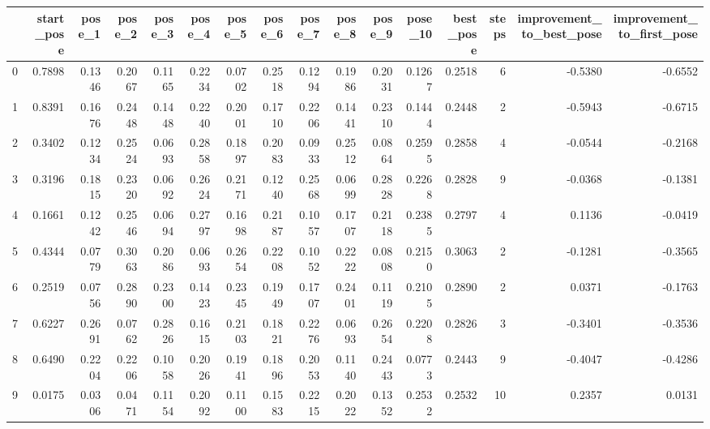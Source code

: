 \begin{tabular}{lrrrrrrrrrrrrrrr}
\toprule
{} &  start\_pose &  pose\_1 &  pose\_2 &  pose\_3 &  pose\_4 &  pose\_5 &  pose\_6 &  pose\_7 &  pose\_8 &  pose\_9 &  pose\_10 &  best\_pose &  steps &  improvement\_to\_best\_pose &  improvement\_to\_first\_pose \\
\midrule
0   &      0.7898 &  0.1346 &  0.2067 &  0.1165 &  0.2234 &  0.0702 &  0.2518 &  0.1294 &  0.1986 &  0.2031 &   0.1267 &     0.2518 &      6 &                   -0.5380 &                    -0.6552 \\
1   &      0.8391 &  0.1676 &  0.2448 &  0.1448 &  0.2240 &  0.2001 &  0.1710 &  0.2206 &  0.1441 &  0.2310 &   0.1444 &     0.2448 &      2 &                   -0.5943 &                    -0.6715 \\
2   &      0.3402 &  0.1234 &  0.2524 &  0.0693 &  0.2858 &  0.1897 &  0.2083 &  0.0933 &  0.2512 &  0.0864 &   0.2595 &     0.2858 &      4 &                   -0.0544 &                    -0.2168 \\
3   &      0.3196 &  0.1815 &  0.2320 &  0.0692 &  0.2624 &  0.2171 &  0.1240 &  0.2568 &  0.0699 &  0.2828 &   0.2268 &     0.2828 &      9 &                   -0.0368 &                    -0.1381 \\
4   &      0.1661 &  0.1242 &  0.2546 &  0.0694 &  0.2797 &  0.1698 &  0.2187 &  0.1057 &  0.1707 &  0.2118 &   0.2385 &     0.2797 &      4 &                    0.1136 &                    -0.0419 \\
5   &      0.4344 &  0.0779 &  0.3063 &  0.2086 &  0.0693 &  0.2654 &  0.2208 &  0.1052 &  0.2222 &  0.0808 &   0.2150 &     0.3063 &      2 &                   -0.1281 &                    -0.3565 \\
6   &      0.2519 &  0.0756 &  0.2890 &  0.2300 &  0.1423 &  0.2345 &  0.1949 &  0.1707 &  0.2401 &  0.1119 &   0.2105 &     0.2890 &      2 &                    0.0371 &                    -0.1763 \\
7   &      0.6227 &  0.2691 &  0.0762 &  0.2826 &  0.1615 &  0.2103 &  0.1821 &  0.2276 &  0.0693 &  0.2654 &   0.2208 &     0.2826 &      3 &                   -0.3401 &                    -0.3536 \\
8   &      0.6490 &  0.2204 &  0.2206 &  0.1058 &  0.2026 &  0.1941 &  0.1896 &  0.2053 &  0.1140 &  0.2443 &   0.0773 &     0.2443 &      9 &                   -0.4047 &                    -0.4286 \\
9   &      0.0175 &  0.0306 &  0.0471 &  0.1154 &  0.2092 &  0.1100 &  0.1583 &  0.2215 &  0.2022 &  0.1352 &   0.2532 &     0.2532 &     10 &                    0.2357 &                     0.0131 \\

\end{tabular}
